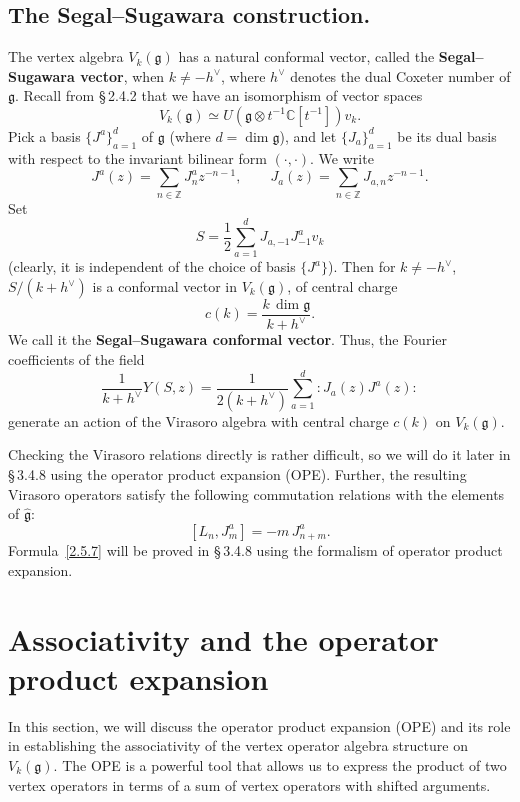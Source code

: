 \documentclass[12pt]{article}
\begin{document}
\subsection{The Segal--Sugawara construction.}
The vertex algebra $V_k(\mathfrak{g})$ has a natural conformal vector,
called the \textbf{Segal--Sugawara vector}, when $k\ne -h^\vee$,
where $h^\vee$ denotes the dual Coxeter number of $\mathfrak{g}$.
Recall from \S\,2.4.2 that we have an isomorphism of vector spaces
\[
    V_k(\mathfrak{g})
    \simeq U(\mathfrak{g}\otimes t^{-1}\mathbb{C}[t^{-1}])v_k.
\]
Pick a basis $\{J^a\}_{a=1}^d$ of $\mathfrak{g}$ (where $d=\dim\mathfrak{g}$),
and let $\{J_a\}_{a=1}^d$ be its dual basis with respect to the invariant
bilinear form $(\cdot,\cdot)$.
We write
\[
    J^a(z) = \sum_{n\in\mathbb{Z}} J^a_n z^{-n-1},
    \qquad
    J_a(z) = \sum_{n\in\mathbb{Z}} J_{a,n} z^{-n-1}.
\]
Set
\begin{equation}\label{2.5.5}
    S = \frac{1}{2}\sum_{a=1}^d J_{a,-1}J^a_{-1}v_k
\end{equation}
(clearly, it is independent of the choice of basis $\{J^a\}$).
Then for $k\ne -h^\vee$, $S/(k+h^\vee)$ is a conformal vector in
$V_k(\mathfrak{g})$, of central charge
\[
    c(k) = \frac{k\,\dim\mathfrak{g}}{k+h^\vee}.
\]
We call it the \textbf{Segal--Sugawara conformal vector}.
Thus, the Fourier coefficients of the field
\begin{equation}\label{2.5.6}
    \frac{1}{k+h^\vee}Y(S,z)
    = \frac{1}{2(k+h^\vee)}\sum_{a=1}^d :J_a(z)J^a(z):
\end{equation}
generate an action of the Virasoro algebra with central charge $c(k)$ on
$V_k(\mathfrak{g})$.

Checking the Virasoro relations directly is rather difficult, so we will
do it later in \S\,3.4.8 using the operator product expansion (OPE).
Further, the resulting Virasoro operators satisfy the following
commutation relations with the elements of $\widehat{\mathfrak{g}}$:
\begin{equation}\label{2.5.7}
    [L_n, J^a_m] = -m\,J^a_{n+m}.
\end{equation}
Formula~\eqref{2.5.7} will be proved in \S\,3.4.8 using the formalism of operator product expansion.

\section{Associativity and the operator product expansion}

In this section, we will discuss the operator product expansion (OPE) and its role in establishing the associativity of the vertex operator algebra structure on $V_k(\mathfrak{g})$. The OPE is a powerful tool that allows us to express the product of two vertex operators in terms of a sum of vertex operators with shifted arguments.
\end{document}

